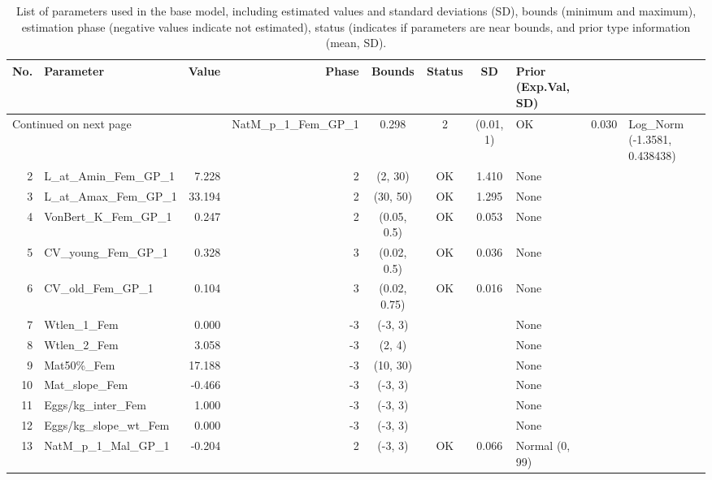 \documentclass[12pt,]{article}
\begin{document}
\FloatBarrier

\FloatBarrier

\FloatBarrier

\begin{landscape}
\begin{longtable}{rlrrcccl}
\caption{List of parameters used in
                                              the base model, including estimated 
                                              values and standard deviations (SD), 
                                              bounds (minimum and maximum), 
                                              estimation phase (negative values indicate
                                              not estimated), status (indicates if 
                                              parameters are near bounds, and prior type
                                              information (mean, SD).} \\ 
  \hline
No. & Parameter & Value & Phase & Bounds & Status & SD & Prior (Exp.Val, SD)  \\ 
  \hline 
\endhead 
\hline 
\multicolumn{3}{l}{\footnotesize Continued on next page} 
\endfoot 
\endlastfoot 
 \hline
1 & NatM\_p\_1\_Fem\_GP\_1 & 0.298 & 2 & (0.01, 1) & OK & 0.030 & Log\_Norm (-1.3581, 0.438438) \\ 
  2 & L\_at\_Amin\_Fem\_GP\_1 & 7.228 & 2 & (2, 30) & OK & 1.410 & None \\ 
  3 & L\_at\_Amax\_Fem\_GP\_1 & 33.194 & 2 & (30, 50) & OK & 1.295 & None \\ 
  4 & VonBert\_K\_Fem\_GP\_1 & 0.247 & 2 & (0.05, 0.5) & OK & 0.053 & None \\ 
  5 & CV\_young\_Fem\_GP\_1 & 0.328 & 3 & (0.02, 0.5) & OK & 0.036 & None \\ 
  6 & CV\_old\_Fem\_GP\_1 & 0.104 & 3 & (0.02, 0.75) & OK & 0.016 & None \\ 
  7 & Wtlen\_1\_Fem & 0.000 & -3 & (-3, 3) &  &  & None \\ 
  8 & Wtlen\_2\_Fem & 3.058 & -3 & (2, 4) &  &  & None \\ 
  9 & Mat50\%\_Fem & 17.188 & -3 & (10, 30) &  &  & None \\ 
  10 & Mat\_slope\_Fem & -0.466 & -3 & (-3, 3) &  &  & None \\ 
  11 & Eggs/kg\_inter\_Fem & 1.000 & -3 & (-3, 3) &  &  & None \\ 
  12 & Eggs/kg\_slope\_wt\_Fem & 0.000 & -3 & (-3, 3) &  &  & None \\ 
  13 & NatM\_p\_1\_Mal\_GP\_1 & -0.204 & 2 & (-3, 3) & OK & 0.066 & Normal (0, 99) \\ 

\end{longtable}
\end{landscape}
\end{document}
